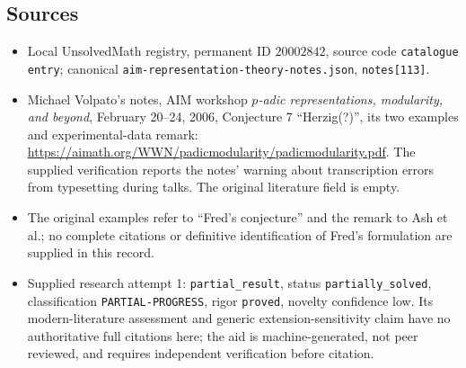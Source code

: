 \documentclass[11pt]{article}
\begin{document}
\subsection{Sources}
\begin{itemize}
\item Local UnsolvedMath registry, permanent ID $20002842$, source code \texttt{catalogue entry}; canonical \texttt{aim-representation-theory-notes.json}, \texttt{notes[113]}.
\item Michael Volpato's notes, AIM workshop \emph{$p$-adic representations, modularity, and beyond}, February 20--24, 2006, Conjecture 7 ``Herzig(?)'', its two examples and experimental-data remark: \url{https://aimath.org/WWN/padicmodularity/padicmodularity.pdf}. The supplied verification reports the notes' warning about transcription errors from typesetting during talks. The original literature field is empty.
\item The original examples refer to ``Fred's conjecture'' and the remark to Ash et al.; no complete citations or definitive identification of Fred's formulation are supplied in this record.
\item Supplied research attempt 1: \texttt{partial\_result}, status \texttt{partially\_solved}, classification \texttt{PARTIAL-PROGRESS}, rigor \texttt{proved}, novelty confidence low. Its modern-literature assessment and generic extension-sensitivity claim have no authoritative full citations here; the aid is machine-generated, not peer reviewed, and requires independent verification before citation.
\end{itemize}
\end{document}

